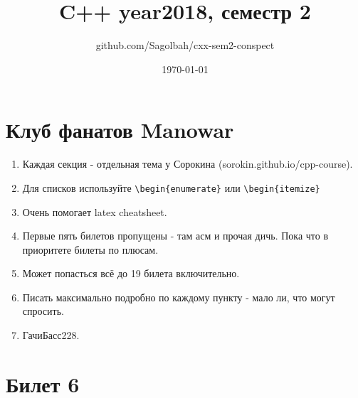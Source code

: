 \documentclass[15pt, a4paper]{article}
\title{C++ year2018, семестр 2}
\author{github.com/Sagolbah/cxx-sem2-conspect}
\date{\today}
\begin{document}
	\section{Клуб фанатов Manowar}
	\begin{enumerate}
		\item Каждая секция - отдельная тема у Сорокина (sorokin.github.io/cpp-course).
		\item Для списков используйте \verb|\begin{enumerate}| или \verb|\begin{itemize}| 
		\item Очень помогает latex cheatsheet.
        \item Первые пять билетов пропущены - там асм и прочая дичь. Пока что в приоритете билеты по плюсам.
        \item Может попасться всё до 19 билета включительно.
        \item Писать максимально подробно по каждому пункту - мало ли, что могут спросить.
        \item ГачиБасс228.
    \end{enumerate}
 
    \section{Билет 6}
\end{document}
